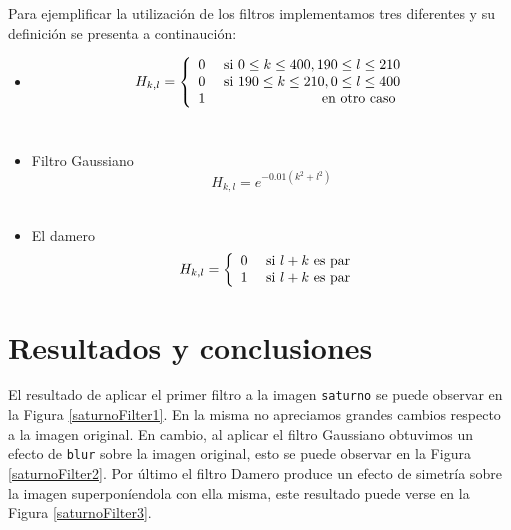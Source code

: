 \documentclass{article}
\begin{document}
\begin{multicols}{2}
\par Para ejemplificar la utilización de los filtros implementamos tres diferentes y su definición se presenta a continaución:

\begin{itemize}
    \item \begin{equation} H_{k,l} = \left\{ \begin{array}{lr}
                                0 & \textnormal{ si } 0 \le k \le 400, 190 \le l \le 210\\
                                0 & \textnormal{ si } 190 \le k \le 210, 0 \le l \le 400\\
                                1 & \textnormal { en otro caso }
                               \end{array}
              \right. 
          \end{equation}\\
    \item Filtro Gaussiano \begin{equation} H_{k,l} = e^{ -0.01 (k^2 + l^2)} \end{equation}\\
    \item El damero \begin{equation} H_{k,l} = \left\{ \begin{array}{lr}
                                0 & \textnormal{ si } l + k \textnormal{ es par }\\
                                1 & \textnormal{ si } l + k \textnormal{ es par }
                               \end{array}
              \right. 
          \end{equation}
\end{itemize}

\section{Resultados y conclusiones}
\label{sec4}

\par El resultado de aplicar el primer filtro a la imagen \verb+saturno+ se puede observar en la Figura \ref{saturnoFilter1}. En la misma no apreciamos grandes cambios respecto a la imagen original. En cambio, al aplicar el filtro Gaussiano obtuvimos un efecto de \verb+blur+ sobre la imagen original, esto se puede observar en la Figura \ref{saturnoFilter2}. Por último el filtro Damero produce un efecto de simetría sobre la imagen superponíendola con ella misma, este resultado puede verse en la Figura \ref{saturnoFilter3}.


\end{multicols}
\end{document}

